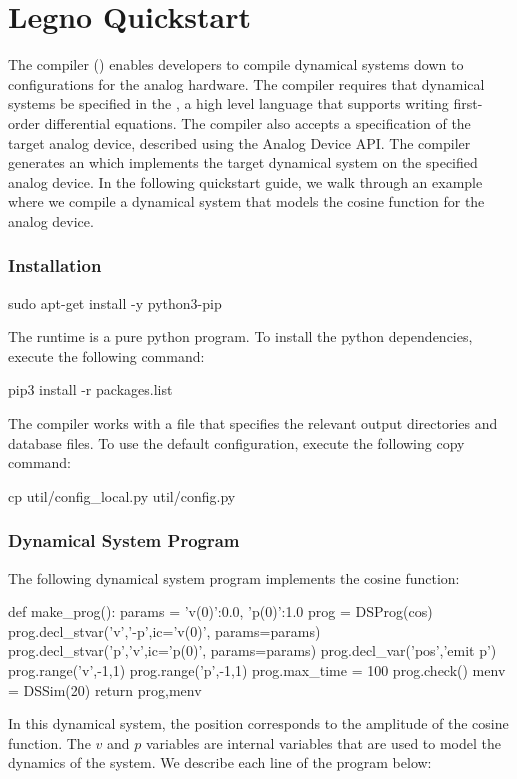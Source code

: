 \chapter{Legno Quickstart}

The \legno compiler () enables developers to compile dynamical
systems down to configurations for the analog hardware. The \legno compiler
requires that dynamical systems be specified in the , a high level language that supports writing first-order
differential equations. The \legno compiler also accepts a specification of the
target analog device, described using the Analog Device API. The \legno compiler
generates an  which implements the target dynamical
system on the specified analog device. In the following quickstart guide, we
walk through an example where we compile a dynamical system that models the
cosine function for the \hcdc analog device. 

\subsection{Installation}

\begin{snippet}
  sudo apt-get install -y python3-pip
\end{snippet}

The \grendel runtime is a pure python program. To install the python
dependencies, execute the following command:

\begin{snippet}
  pip3 install -r packages.list
\end{snippet}

The \legno compiler works with a 
file that specifies the relevant output directories and database files. To use
the default configuration, execute the following copy command:

\begin{snippet}
cp util/config_local.py util/config.py
\end{snippet}

\subsection{Dynamical System Program}
The following dynamical system program implements the cosine function:
\begin{dssnippet}
def make_prog():
  params = {
    'v(0)':0.0,
    'p(0)':1.0
  }
  prog = DSProg(cos)
  prog.decl_stvar('v','-p',ic='{v(0)}', params=params)
  prog.decl_stvar('p','v',ic='{p(0)}', params=params)
  prog.decl_var('pos','emit p')
  prog.range('v',-1,1)
  prog.range('p',-1,1)
  prog.max_time = 100
  prog.check()
  menv = DSSim(20)
  return prog,menv
  
\end{dssnippet}
In this dynamical system, the position  corresponds to the amplitude of
the cosine function. The $v$ and $p$ variables are internal variables that are
used to model the dynamics of the system. We describe each line of the program
below:

